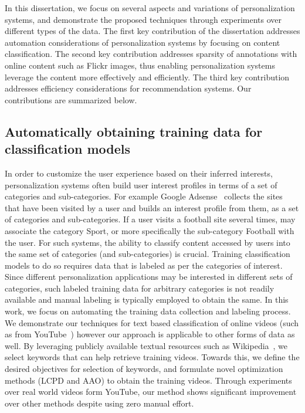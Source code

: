 \documentclass[12pt]{ucsddissertation}
\begin{document}

In this dissertation, we focus on several aspects and variations of personalization systems, and demonstrate the proposed techniques through experiments over different types of the data. The first key contribution of the dissertation addresses automation considerations of personalization systems by focusing on content classification. The second key contribution addresses sparsity of annotations with online content such as Flickr images, thus enabling personalization systems leverage the content more effectively and efficiently. The third key contribution addresses efficiency considerations for recommendation systems. Our contributions are summarized below. 

\subsection{Automatically obtaining training data for classification models}

In order to customize the user experience based on their inferred interests, personalization systems often build user interest profiles in terms of a set of categories and sub-categories. For example Google Adsense~\cite{GoogleAdsense} collects the sites that have been visited by a user and builds an interest profile from them, as a set of categories and sub-categories. If a user visits a football site several times, \cite{GoogleAdsense} may associate the category Sport, or more specifically the sub-category Football with the user. For such systems, the ability to classify content accessed by users into the same set of categories (and sub-categories) is crucial. Training classification models to do so requires data that is labeled as per the categories of interest. Since different personalization applications may be interested in different sets of categories, such labeled training data for arbitrary categories is not readily available and manual labeling is typically employed to obtain the same. In this work, we focus on automating the training data collection and labeling process. We demonstrate our techniques for text based classification of online videos (such as from YouTube~\cite{Youtube}) however our approach is applicable to other forms of data as well. By leveraging publicly available textual resources such as Wikipedia~\cite{website:Wikipedia}, we select keywords that can help retrieve training videos. Towards this, we define the desired objectives for selection of keywords, and formulate novel optimization methods (LCPD and AAO) to obtain the training videos. Through experiments over real world videos form YouTube, our method shows significant improvement over other methods despite using zero manual effort. 
\end{document}
